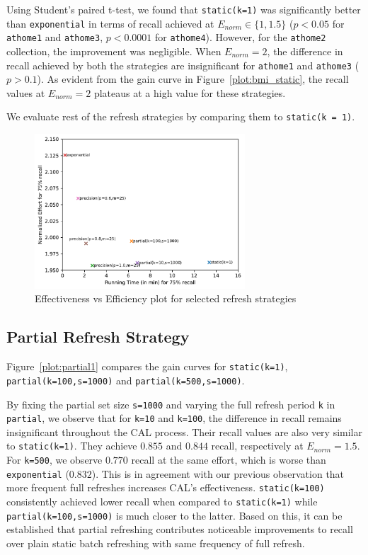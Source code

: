 Using Student's paired t-test, we found that \texttt{static(k=1)} was
significantly better than \texttt{exponential} in terms of recall achieved at
$E_{norm} \in \{1,1.5\}$ ($p < 0.05$ for \texttt{athome1} and \texttt{athome3},
$p < 0.0001$ for \texttt{athome4}). However, for the \texttt{athome2}
collection, the improvement was negligible. When $E_{norm} = 2$, the difference
in recall achieved by both the strategies are insignificant for \texttt{athome1}
and \texttt{athome3} ($p > 0.1$). As evident from the gain curve in
Figure~\ref{plot:bmi_static}, the recall values at $E_{norm} = 2$ plateaus
at a high value for these strategies.

We evaluate rest of the refresh strategies by comparing them to
\texttt{static(k = 1)}.

\begin{figure}
    \centering
    \includegraphics[width=0.7\textwidth]{plots/eff_vs_eff.pdf}
    \caption{Effectiveness vs Efficiency plot for selected refresh strategies}
    \label{plot:eff_vs_eff}
\end{figure}

\subsection*{Partial Refresh Strategy}
Figure~\ref{plot:partial1} compares the gain curves for
\texttt{static(k=1)}, \texttt{partial(k=100,s=1000)} and
\texttt{partial(k=500,s=1000)}.

By fixing the partial set size \texttt{s=1000} and varying the full refresh
period \texttt{k} in \texttt{partial}, we observe
that for \texttt{k=10} and \texttt{k=100}, the difference in recall remains insignificant throughout the
CAL process. Their recall values are also very similar to
\texttt{static(k=1)}. They achieve $0.855$ and $0.844$ recall, respectively at
$E_{norm} = 1.5$. For \texttt{k=500}, we observe $0.770$ recall at the
same effort, which is worse than \texttt{exponential} ($0.832$). This is in
agreement with our previous observation that more frequent full refreshes
increases CAL's effectiveness. \texttt{static(k=100)}
consistently achieved lower recall when compared to \texttt{static(k=1)} while
\texttt{partial(k=100,s=1000)} is much closer to the latter. Based
on this, it can be established that partial refreshing contributes noticeable
improvements to recall over plain static batch refreshing with same 
frequency of full refresh.

